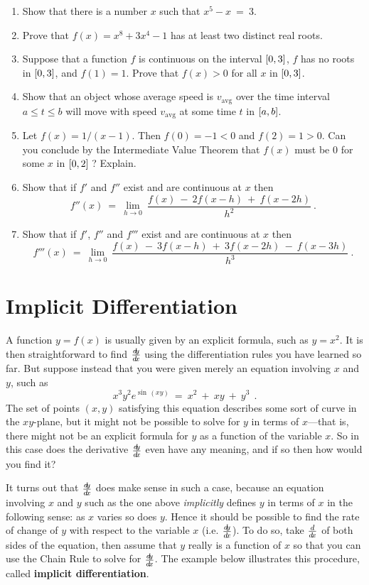 {\begin{enumerate}[item-label={\bfseries \arabic*.}]
  maximum value and a minimum value in that interval? If so, then give an
  example; if not then explain why.
 \item Show that there is a number $x$ such that $x^5  - x ~=~ 3$.
 \item Prove that $f(x) = x^8 + 3x^4 - 1$ has at least two distinct real roots.
 \item Suppose that a  function $f$ is continuous on the interval $\lbrack 0,3 \rbrack$,
  $f$ has no roots in $\lbrack 0,3 \rbrack$, and $f(1) = 1$. Prove that $f(x) > 0$ for
  all $x$ in $\lbrack 0,3 \rbrack$.
 \item Show that an object whose average speed is $v_{\text{avg}}$ over the time
  interval $a\le t \le b$ will move with speed $v_{\text{avg}}$ at some time $t$
  in $\lbrack a,b \rbrack$.
 \item Let $f(x) = 1/(x-1)$. Then $f(0) = -1 <0$ and $f(2) = 1 > 0$. Can you
  conclude by the Intermediate Value Theorem that $f(x)$ must be $0$ for some
  $x$ in $\lbrack 0,2 \rbrack\;$? Explain.
 \item Show that if $f'$ and $f''$ exist and are continuous at $x$ then
\[
f''(x) ~=~ \lim_{h \to 0}~\frac{f(x) ~-~ 2 f(x-h) ~+~ f(x-2h)}{h^2} ~.
\]
 \item Show that if $f'$, $f''$ and $f'''$ exist and are continuous at $x$ then
\[
f'''(x) ~=~ \lim_{h \to 0}~\frac{f(x) ~-~ 3 f(x-h) ~+~ 3 f(x-2h) ~-~ f(x-3h)}{h^3} ~.
\]
\end{enumerate}
}
\newpage
\section{Implicit Differentiation}
A function $y = f(x)$ is usually given by an explicit formula, such as
$y = x^2$. It is then straightforward to find $\frac{d\negmedspace y}{d\!x}$ using the differentiation
rules you have learned so far. But suppose instead that you were given merely an
equation involving $x$ and $y$, such as
\[
x^3 y^2 e^{\sin\,(xy)} ~=~ x^2 ~+~ xy ~+~ y^3 ~~.
\]
The set of points $(x,y)$ satisfying this equation describes some sort of curve
in the $xy$-plane, but it might not be possible to solve for $y$ in terms of
$x$---that is, there might not be an explicit formula for $y$ as a function of
the variable $x$. So in this case does the derivative $\frac{d\negmedspace y}{d\!x}$ even have any
meaning, and if so then how would you find it?

It turns out that $\frac{d\negmedspace y}{d\!x}$ does make sense in such a case, because an equation
involving $x$ and $y$ such as the one above
\emph{implicitly} defines $y$ in terms of
$x$ in the following sense: as $x$ varies so
does $y$. Hence it should be possible to find the rate of change of $y$
with respect to the variable $x$ (i.e. $\frac{d\negmedspace y}{d\!x}$). To do so, take $\frac{d}{d\!x}$ of both
sides of the equation, then assume that $y$ really is a function of $x$ so that
you can use the Chain Rule to solve for $\frac{d\negmedspace y}{d\!x}$. The example below illustrates
this procedure, called \textbf{implicit differentiation}.

